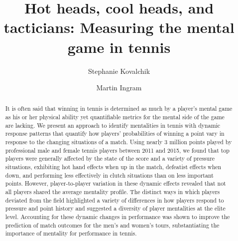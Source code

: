 \documentclass{Latex/svjour3}
\begin{document}
\title{Hot heads, cool heads, and tacticians: Measuring the mental game in
  tennis}



\author{Stephanie Kovalchik\and Martin Ingram}


\date{}

\maketitle

\begin{abstract}

It is often said that winning in tennis is determined as much by a player's
mental game as his or her physical ability yet quantifiable metrics for the
mental side of the game are lacking. We present an approach to identify
mentalities in tennis with dynamic response patterns that quantify how players'
probabilities of winning a point vary in response to the changing situations of
a match. Using nearly 3 million points played by professional male and female
tennis players between 2011 and 2015, we found that top players  were generally affected by the state of the score
and a variety of pressure situations, exhibiting hot hand effects when up in the
match, defeatist effects when down, and performing less effectively in clutch
situations than on less important points. However, player-to-player variation in
these dynamic effects revealed that not all players shared the average mentality
profile. The distinct ways in which players deviated from the field highlighted
a variety of differences in how players respond to pressure and point history
and suggested a diversity of player mentalities at the elite level. Accounting
for these dynamic changes in performance was shown to improve the prediction of
match outcomes for the men's and women's tours, substantiating the importance of
mentality for performance in tennis.


\end{abstract}
\end{document}
